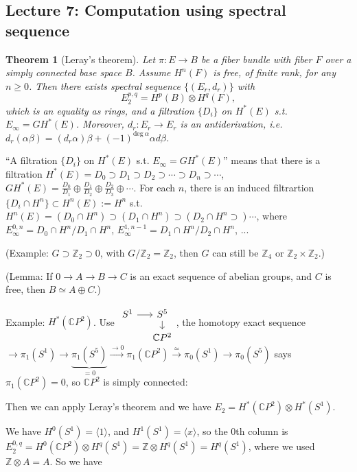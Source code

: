 \documentclass{article}
\theoremstyle{mystyle}
\newtheorem*{theorem*}{Theorem}
\theoremstyle{remark}
\numberwithin{equation}{section}
\begin{document}
\subsection{Lecture 7: Computation using spectral sequence}


\begin{theorem*}[Leray's theorem] Let $\pi\colon E\rightarrow B$ be a fiber bundle with fiber $F$ over a simply connected  base space $B$. Assume $H^n(F)$ is free, of finite rank, for any $n\geq 0$. Then there exists spectral sequence $\{(E_r,d_r)\}$ with 
$$E^{p,q}_2 = H^p(B)\otimes H^q(F),$$
which is an equality as rings, and a filtration $\{D_i\}$ on $H^*(E)$ s.t. $E_\infty = GH^*(E)$. Moreover, $d_r:E_r\rightarrow E_r$ is an antiderivation, i.e. $d_r(\alpha\beta) = (d_r\alpha)\beta+(-1)^{\text{deg}~\alpha} \alpha d\beta$. 
\end{theorem*}
``A filtration $\{D_i\}$ on $H^*(E)$ s.t. $E_\infty = GH^*(E)$'' means that there is a filtration $H^*(E)=D_0\supset D_1\supset D_2\supset \cdots \supset D_n\supset \cdots$,  $GH^*(E) = \frac{D_0}{D_1}\oplus \frac{D_1}{D_2}\oplus \frac{D_2}{D_3}\oplus \cdots$. For each $n$, there is an induced filtrartion $\{D_i\cap H^n\} \subset H^n(E):=H^n$ s.t. $H^n(E) = (D_0\cap H^n)\supset (D_1 \cap H^n) \supset (D_2\cap H^n\supset) \cdots$, where $E^{0,n}_\infty = D_0\cap H^n/D_1\cap H^n$, $E_\infty^{1,n-1} = D_1\cap H^n/D_2\cap H^n$, ... 


(Example: $G\supset \mathbb{Z}_2\supset 0$, with $G/\mathbb{Z}_2=\mathbb{Z}_2$, then $G$ can still be $\mathbb{Z}_4$ or $\mathbb{Z}_2\times \mathbb{Z}_2$.) 

(Lemma: If $0\rightarrow A\rightarrow B\rightarrow C$ is an exact sequence of abelian groups, and $C$ is free, then $B\simeq A\oplus C$.)

Example: $H^*(\mathbb{C}P^2)$.  Use $\begin{tikzcd}[column sep = small, row sep = small] S^1\ar[r]  & S^5 \ar[d]\\ &\mathbb{C}P^2
\end{tikzcd}$, the homotopy exact sequence $\rightarrow \pi_1(S^1)\rightarrow \underbrace{\pi_1(S^5)}_{=0}\xrightarrow{\rightarrow 0} \pi_1(\mathbb{C}P^2) \xrightarrow{\simeq} \pi_0(S^1)\rightarrow \pi_0(S^5)$ says $\pi_1(\mathbb{C}P^2)=0$, so $\mathbb{C}P^2$ is simply connected:

Then we can apply Leray's theorem and we have $E_2 = H^*(\mathbb{C}P^2)\otimes H^*(S^1)$. 

We have $H^0(S^1) = \langle 1\rangle$, and $H^1(S^1) = \langle x\rangle$, so the $0$th column is $E_2^{0,q} = H^0(\mathbb{C}P^2) \otimes H^q(S^1) = \mathbb{Z}\otimes H^q(S^1) = H^q(S^1)$, where we used $\mathbb{Z}\otimes A = A$. So we have
\end{document}
